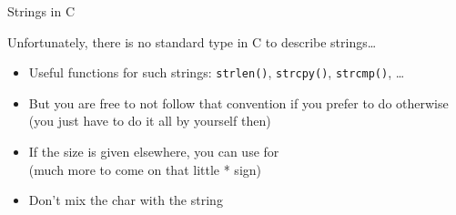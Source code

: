 \begin{Coupe}
\begin{frame}[fragile]{Strings in C}
\begin{block}{Unfortunately, there is no standard type in C to describe strings\ldots}
\begin{itemize}
\begin{columns}
\begin{column}{.35\linewidth}
\begin{boitecode}{}
          \end{boitecode}
        \end{column}
        \begin{column}{.6\linewidth}
          \texttt{[image: c\_layout\_string.fig]}
        \end{column}
      \end{columns}
    \item Useful functions for such strings:
      {\small\texttt{strlen()}, \texttt{strcpy()}, \texttt{strcmp()}, \ldots}
      \medskip
    \item But you are free to not follow that convention if you prefer to do 
      otherwise\\
      (you just have to do it all by yourself then)
    \item If the size is given elsewhere, you can use 
      for \\
      {({\sc much} more to come on that little * sign)}
    \item Don't mix the char  with the string 
    \end{itemize}
  \end{block}
\end{frame}


\end{Coupe}
